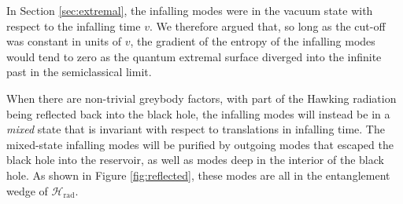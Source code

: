 \documentclass[11pt,a4paper]{article}
\begin{document}
In Section \ref{sec:extremal}, the infalling modes were in the vacuum state with respect to the infalling time $v$. We therefore argued that, so long as the cut-off was constant in units of $v$, the gradient of the entropy of the infalling modes would tend to zero as the quantum extremal surface diverged into the infinite past in the semiclassical limit.

When there are non-trivial greybody factors, with part of the Hawking radiation being reflected back into the black hole, the infalling modes will instead be in a \emph{mixed} state that is invariant with respect to translations in infalling time. The mixed-state infalling modes will be purified by outgoing modes that escaped the black hole into the reservoir, as well as modes deep in the interior of the black hole. As shown in Figure \ref{fig:reflected}, these modes are all in the entanglement wedge of $\mathcal{H}_\text{rad}$. 
\end{document}
